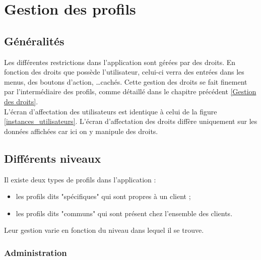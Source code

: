\section{Gestion des profils}


\subsection{Généralités}

Les différentes restrictions dans l'application sont gérées par des droits.
En fonction des droits que possède l'utilisateur, celui-ci verra des entrées dans les menus, des boutons d'action, \ldots cachés.
Cette gestion des droits se fait finement par l'intermédiaire des profils, comme détaillé dans le chapitre précédent \ref{Gestion des droits}.
\\

L'écran d'affectation des utilisateurs est identique à celui de la figure \ref{instances_utilisateurs}.
L'écran d'affectation des droits diffère uniquement sur les données affichées car ici on y manipule des droits.


\subsection{Différents niveaux}

Il existe deux types de profils dans l'application :
\begin{itemize}
	\item les profils dits "spécifiques" qui sont propres à un client ;
	\item les profils dits "communs" qui sont présent chez l'ensemble des clients.
\end{itemize}
Leur gestion varie en fonction du niveau dans lequel il se trouve.


\subsubsection{Administration}
\label{IN_GestionDesProfils_DifférentsNiveaux_Administration}

